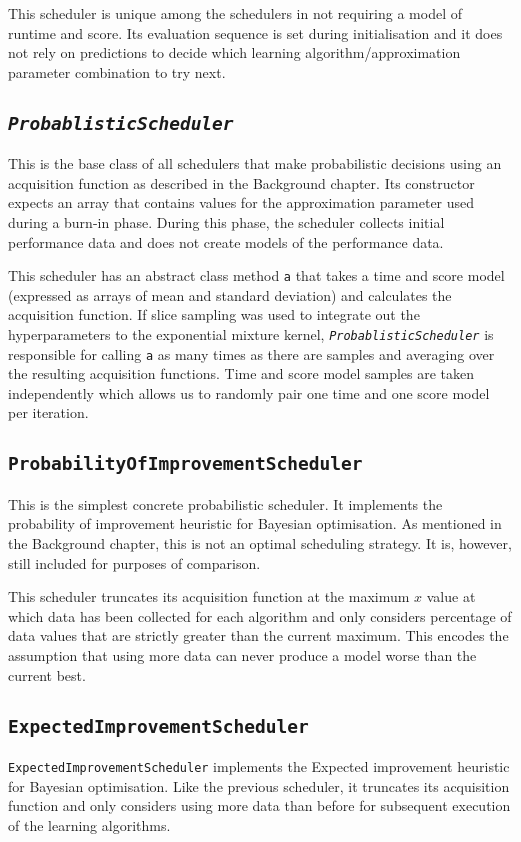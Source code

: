 \documentclass[a4paper,12pt,twoside,openright]{report}
\begin{document}
This scheduler is unique among the schedulers in not requiring a model of runtime and score. Its evaluation sequence is set during initialisation and it does not rely on predictions to decide which learning algorithm/approximation parameter combination to try next.


\subsection{\texttt{\textit{ProbablisticScheduler}}}

This is the base class of all schedulers that make probabilistic decisions using an acquisition function as described in the Background chapter. Its constructor expects an array that contains values for the approximation parameter used during a burn-in phase. During this phase, the scheduler collects initial performance data and does not create models of the performance data.

This scheduler has an abstract class method \texttt{a} that takes a time and score model (expressed as arrays of mean and standard deviation) and calculates the acquisition function. If slice sampling was used to integrate out the hyperparameters to the exponential mixture kernel, \texttt{\textit{ProbablisticScheduler}} is responsible for calling \texttt{a} as many times as there are samples and averaging over the resulting acquisition functions. Time and score model samples are taken independently which allows us to randomly pair one time and one score model per iteration.

\subsection{\texttt{ProbabilityOfImprovementScheduler}}
This is the simplest concrete probabilistic scheduler. It implements the probability of improvement heuristic for Bayesian optimisation. As mentioned in the Background chapter, this is not an optimal scheduling strategy. It is, however, still included for purposes of comparison.

This scheduler truncates its acquisition function at the maximum $x$ value at which data has been collected for each algorithm and only considers percentage of data values that are strictly greater than the current maximum. This encodes the assumption that using more data can never produce a model worse than the current best.

\subsection{\texttt{ExpectedImprovementScheduler}}
\texttt{ExpectedImprovementScheduler} implements the Ex\-pec\-ted im\-prove\-ment heu\-ris\-tic for Bayesian optimisation. Like the previous scheduler, it truncates its acquisition function and only considers using more data than before for subsequent execution of the learning algorithms.
\end{document}
